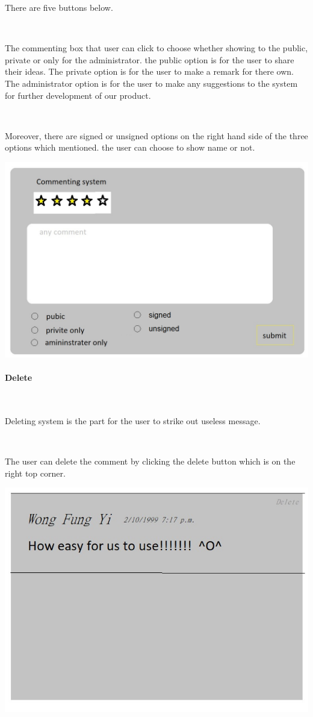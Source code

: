 There are five buttons below.\par~

The commenting box that user can click to choose whether showing to the public, private or only for the administrator. the public option is for the user to share their ideas. The private option is for the user to make a remark for there own. The administrator option is for the user to make any suggestions to the system for further development of our product.\par~

Moreover, there are signed or unsigned options on the right hand side of the three options which mentioned. the user can choose to show name or not.

\includegraphics[scale=0.5]{Doc/Graphics/sdfg}

\paragraph{Delete}~

Deleting system is the part for the user to strike out useless message.\par~

The user can delete the comment by clicking the delete button which is on the right top corner.

\includegraphics[scale=0.5]{Doc/Graphics/asdf}

